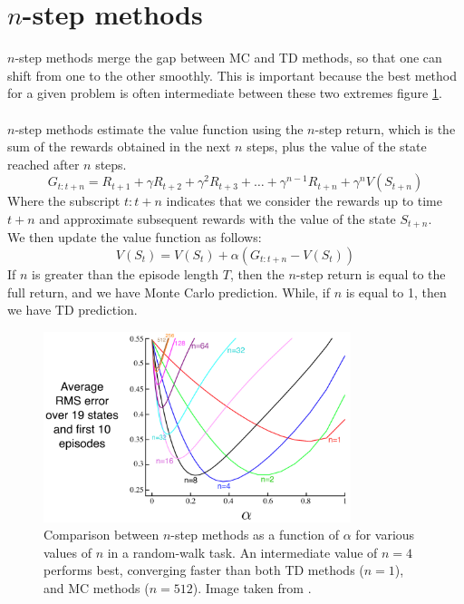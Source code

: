 \section{$n$-step methods}
$n$-step methods merge the gap between MC and TD methods, so that one can shift from one to the other smoothly. This is important because the best method for a given problem is often intermediate between these two extremes figure \ref{fig:n-step-comparison}.\\\\
$n$-step methods estimate the value function using the $n$-step return, which is the sum of the rewards obtained in the next $n$ steps, plus the value of the state reached after $n$ steps.\\
\begin{equation}
    G_{t:t+n} = R_{t+1} + \gamma R_{t+2} + \gamma^2 R_{t+3} + \dots + \gamma^{n-1} R_{t+n} + \gamma^n V(S_{t+n})
    \label{n-step-return}
\end{equation}
Where the subscript $t:t+n$ indicates that we consider the rewards up to time $t+n$ and approximate subsequent rewards with the value of the state $S_{t+n}$.\\
We then update the value function as follows:
\begin{equation}
    V(S_t) = V(S_t) + \alpha (G_{t:t+n} - V(S_t))
    \label{n-step-update}
\end{equation}
If $n$ is greater than the episode length $T$, then the $n$-step return is equal to the full return, and we have Monte Carlo prediction. While, if $n$ is equal to 1, then we have TD prediction.
\begin{figure}[H]
    \centering
    \includegraphics[width=0.8\textwidth]{images/n-step-comparison.png}
    \caption{Comparison between $n$-step methods as a function of $\alpha$ for various values of $n$ in a random-walk task. An intermediate value of $n=4$ performs best, converging faster than both TD methods ($n=1$), and  MC methods ($n=512$). Image taken from \cite{sutton-barto}.}
    \label{fig:n-step-comparison}
\end{figure}
